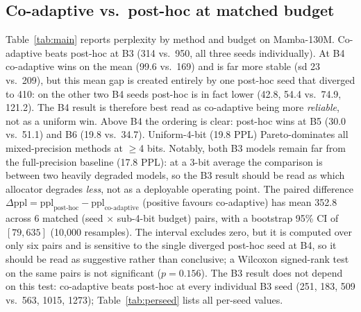 \documentclass[conference]{IEEEtran}
\begin{document}
\subsection{Co-adaptive vs.\ post-hoc at matched budget}
Table~\ref{tab:main} reports perplexity by method and budget on Mamba-130M.
Co-adaptive beats post-hoc at B3 (314 vs.\ 950, all three seeds individually). At
B4 co-adaptive wins on the mean (99.6 vs.\ 169) and is far more stable (sd 23 vs.\
209), but this mean gap is created entirely by one post-hoc seed that diverged to
410: on the other two B4 seeds post-hoc is in fact lower (42.8, 54.4 vs.\ 74.9,
121.2). The B4 result is therefore best read as co-adaptive being more
\emph{reliable}, not as a uniform win. Above B4 the ordering is clear: post-hoc
wins at B5 (30.0 vs.\ 51.1) and B6 (19.8 vs.\ 34.7). Uniform-4-bit (19.8 PPL) Pareto-dominates all mixed-precision
methods at $\geq$4 bits. Notably, both B3 models remain far from the
full-precision baseline (17.8 PPL): at a 3-bit average the comparison is between
two heavily degraded models, so the B3 result should be read as which allocator
degrades \emph{less}, not as a deployable operating point. The paired difference
$\Delta\text{ppl} = \text{ppl}_{\text{post-hoc}} - \text{ppl}_{\text{co-adaptive}}$
(positive favours co-adaptive) has mean 352.8 across 6 matched (seed $\times$
sub-4-bit budget) pairs, with a bootstrap 95\% CI of $[79, 635]$ (10{,}000
resamples). The interval excludes zero, but it is computed over only six pairs and
is sensitive to the single diverged post-hoc seed at B4, so it should be read as
suggestive rather than conclusive; a Wilcoxon signed-rank test on the same pairs
is not significant ($p=0.156$). The B3 result does not depend on this test: co-adaptive
beats post-hoc at every individual B3 seed (251, 183, 509 vs.\ 563, 1015, 1273);
Table~\ref{tab:perseed} lists all per-seed values.
\end{document}
